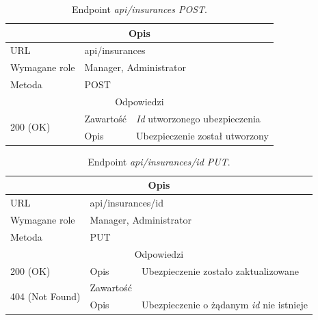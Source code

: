 \documentclass[eng,printmode,openany]{mgr}
\begin{document}
	\begin{table}[H]
		\caption{Endpoint \textit{api/insurances POST}.}
		\begin{tabularx}{\textwidth}{|l|l|X|}
			\hline
			\multicolumn{3}{|c|}{Opis}
			\\ \hline
			URL                       & \multicolumn{2}{l|}{api/insurances}
			\\ \hline
			Wymagane role             & \multicolumn{2}{l|}{Manager, Administrator}
			\\ \hline
			Metoda                    & \multicolumn{2}{l|}{POST}
			\\ \hline
			\multicolumn{3}{|c|}{Odpowiedzi}
			\\ \hline
			\multirow{2}{*}{200 (OK)} 		& Zawartość     & \textit{Id} utworzonego ubezpieczenia
			\\ \cline{2-3}                  & Opis         	& Ubezpieczenie został utworzony
			\\ \hline
		\end{tabularx}
	\end{table}
	
	\begin{table}[H]
		\caption{Endpoint \textit{api/insurances/id PUT}.}
		\begin{tabularx}{\textwidth}{|l|l|X|}
			\hline
			\multicolumn{3}{|c|}{Opis}
			\\ \hline
			URL                       & \multicolumn{2}{l|}{api/insurances/id}
			\\ \hline
			Wymagane role             & \multicolumn{2}{l|}{Manager, Administrator}
			\\ \hline
			Metoda                    & \multicolumn{2}{l|}{PUT}
			\\ \hline
			\multicolumn{3}{|c|}{Odpowiedzi}
			\\ \hline
			200 (OK) 		                        & Opis      	& Ubezpieczenie zostało zaktualizowane
			\\ \hline
			\multirow{2}{*}{404 (Not Found)} 	    & Zawartość     & 
			\\ \cline{2-3}                          & Opis          & Ubezpieczenie o żądanym \textit{id} nie istnieje
			\\ \hline
		\end{tabularx}
	\end{table}
	
\end{document}
